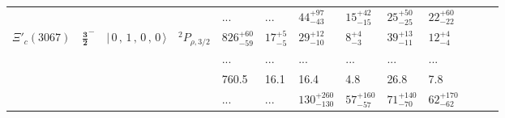 \documentclass[11pt]{article}
\begin{document}
\begin{table}[htbp]
{\begin{tabular}{c c c c  p{1.0cm}  p{1.0cm}  p{1.0cm}  p{1.0cm}  p{1.0cm}  p{1.0cm}  p{1.0cm}  p{1.0cm}  p{1.0cm}}
  & &  &   & ... & ... & $44^{+97}_{-43}$ & $15^{+42}_{-15}$ & $25^{+50}_{-25}$ & $22^{+60}_{-22}$  &  \\
$\Xi'_c(3067)$  & $ \mathbf{\frac{3}{2}^-}$ & $\vert \,0\,,\,1\,,\,0\,,\,0 \,\rangle $ &$^{2}P_{\rho,3/2}$&$ 826 _{- 59 }^{+ 60 }$    &  $ 17 _{- 5 }^{+ 5 }$    &  $ 29 _{- 10 }^{+ 12 }$    &  $ 8 _{- 3 }^{+ 4 }$    &  $ 39 _{- 11 }^{+ 13 }$    &  $ 12 _{- 4 }^{+ 4 }$   \\
 & &  &   & ... & ... & ... & ... & ... & ... &  \\
 & &  &   & 760.5 & 16.1 & 16.4 & 4.8 & 26.8 & 7.8 &  \\
  & &  &   & ... & ... & $130^{+260}_{-130}$ & $57^{+160}_{-57}$ & $71^{+140}_{-70}$ & $62^{+170}_{-62}$  &  \\
\hline \hline
\end{tabular}
}
\end{table}
\end{document}
